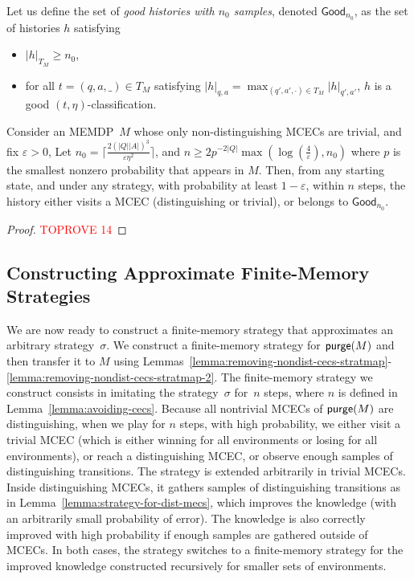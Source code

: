 \documentclass[a4paper,USenglish,cleveref, autoref, thm-restate]{lipics-v2021}
\let\epsilon\varepsilon
\def\abs#1{\ensuremath{\lvert #1 \rvert}}
\def\Good{\textsf{Good}}
\def\Act{A}
\newcommand\purge[1]{\textrm{\sf purge}(#1)}
\begin{document}
\def\good{\textrm{\sf Good}}
Let us define the set of \emph{good histories with $n_0$ samples}, denoted $\Good_{n_0}$, as the set of histories $h$ satisfying
\begin{itemize}
  \item $\abs{h}_{T_M}\geq n_0$,
  \item for all $t=(q,a,\_)\in T_M$ satisfying $\abs{h}_{q,a} {=} \max_{(q',a',\cdot) \in T_M} \abs{h}_{q',a'}$, 
  $h$ is a good $(t,\eta)$-classification.
\end{itemize}


  \begin{lemma}
    \label{lemma:avoiding-cecs}
    Consider an MEMDP~$M$ whose only non-distinguishing MCECs are trivial, and fix $\epsilon>0$, 
    Let $n_0 = \lceil\frac{2(\abs{Q}\abs{\Act})^3}{\epsilon\eta^2} \rceil$, and 
    $n \geq 2 p^{-2\abs{Q}} \max(\log(\frac{4}{\epsilon}),  n_0)$
    where $p$ is the smallest nonzero probability that appears in $M$.
    Then, from any starting state, and under any strategy, with probability at least $1-\epsilon$,
    within $n$ steps, the history either visits a MCEC
    (distinguishing or trivial), or belongs to $\Good_{n_0}$.
  \end{lemma}

\begin{proof}\textcolor{red}{TOPROVE 14}\end{proof}




\subsection{Constructing Approximate Finite-Memory Strategies}
\label{section:constructing-finite-memory-strategies}

We are now ready to construct a finite-memory strategy that approximates an arbitrary strategy~$\sigma$.
We construct a finite-memory strategy for $\purge{M}$ and then transfer it to $M$ 
using Lemmas~\ref{lemma:removing-nondist-cecs-stratmap}-\ref{lemma:removing-nondist-cecs-stratmap-2}.
The finite-memory strategy we construct consists in imitating the strategy~$\sigma$ for~$n$ steps, where $n$ is defined in Lemma~\ref{lemma:avoiding-cecs}.
Because all nontrivial MCECs of $\purge{M}$ are distinguishing, when we play for $n$ steps, with high probability,
we either visit a trivial MCEC (which is either winning for all environments or losing for all environments), 
or reach a distinguishing MCEC, or observe enough samples of distinguishing transitions.
The strategy is extended arbitrarily in trivial MCECs. Inside distinguishing MCECs, it gathers samples of distinguishing transitions
as in Lemma~\ref{lemma:strategy-for-dist-mecs}, which improves the knowledge (with an arbitrarily small probability of error). The knowledge is also correctly improved with high probability if enough samples are gathered outside of MCECs. 
In both cases, the strategy switches to a finite-memory strategy for the improved knowledge constructed recursively for smaller sets of environments.
\end{document}
